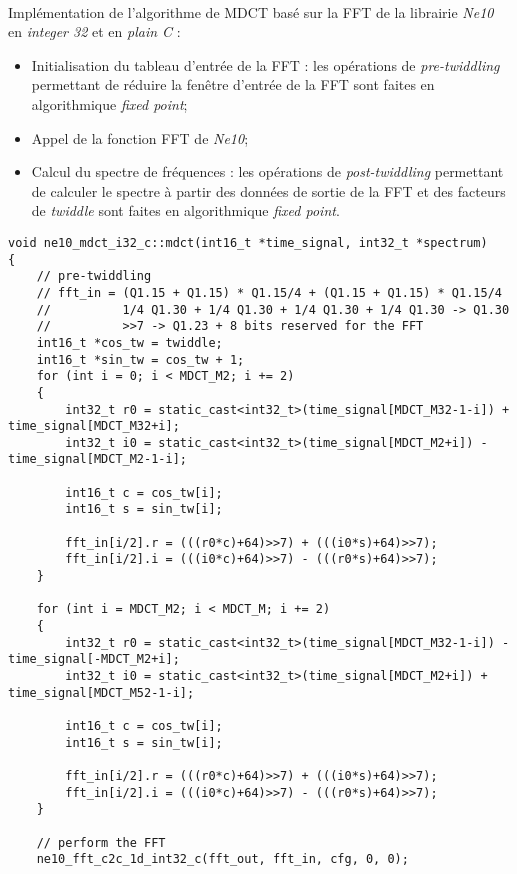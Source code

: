 \documentclass{article}
\begin{document}
\paragraph{}
Implémentation de l'algorithme de MDCT basé sur la FFT de la librairie \emph{Ne10} en \emph{integer 32} et en \emph{plain C} :
\begin{itemize}
    \item Initialisation du tableau d'entrée de la FFT : les opérations de \emph{pre-twiddling} permettant de réduire la fenêtre d'entrée de la FFT sont faites en algorithmique \emph{fixed point};
    \item Appel de la fonction FFT de \emph{Ne10};
    \item Calcul du spectre de fréquences : les opérations de \emph{post-twiddling} permettant de calculer le spectre à partir des données de sortie de la FFT et des facteurs de \emph{twiddle} sont faites en algorithmique \emph{fixed point}.
\end{itemize}
\lstset{language=C++}
\begin{lstlisting}
void ne10_mdct_i32_c::mdct(int16_t *time_signal, int32_t *spectrum)
{
    // pre-twiddling
    // fft_in = (Q1.15 + Q1.15) * Q1.15/4 + (Q1.15 + Q1.15) * Q1.15/4
    //          1/4 Q1.30 + 1/4 Q1.30 + 1/4 Q1.30 + 1/4 Q1.30 -> Q1.30
    //          >>7 -> Q1.23 + 8 bits reserved for the FFT
    int16_t *cos_tw = twiddle;
    int16_t *sin_tw = cos_tw + 1;
    for (int i = 0; i < MDCT_M2; i += 2)
    {
        int32_t r0 = static_cast<int32_t>(time_signal[MDCT_M32-1-i]) + time_signal[MDCT_M32+i];
        int32_t i0 = static_cast<int32_t>(time_signal[MDCT_M2+i]) - time_signal[MDCT_M2-1-i];

        int16_t c = cos_tw[i];
        int16_t s = sin_tw[i];

        fft_in[i/2].r = (((r0*c)+64)>>7) + (((i0*s)+64)>>7);
        fft_in[i/2].i = (((i0*c)+64)>>7) - (((r0*s)+64)>>7);
    }

    for (int i = MDCT_M2; i < MDCT_M; i += 2)
    {
        int32_t r0 = static_cast<int32_t>(time_signal[MDCT_M32-1-i]) - time_signal[-MDCT_M2+i];
        int32_t i0 = static_cast<int32_t>(time_signal[MDCT_M2+i]) + time_signal[MDCT_M52-1-i];

        int16_t c = cos_tw[i];
        int16_t s = sin_tw[i];

        fft_in[i/2].r = (((r0*c)+64)>>7) + (((i0*s)+64)>>7);
        fft_in[i/2].i = (((i0*c)+64)>>7) - (((r0*s)+64)>>7);
    }

    // perform the FFT
    ne10_fft_c2c_1d_int32_c(fft_out, fft_in, cfg, 0, 0);
\end{lstlisting}
\end{document}
